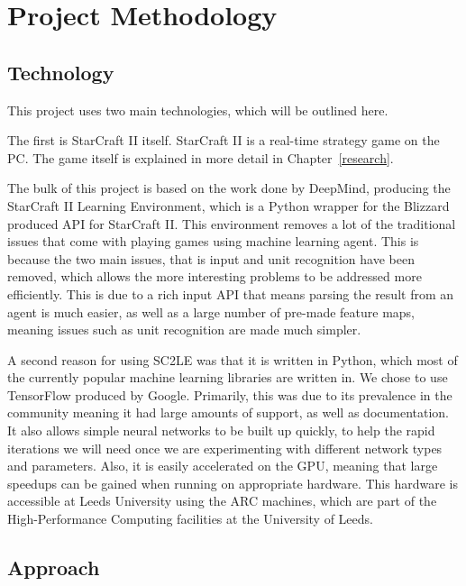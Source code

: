 \chapter{Project Methodology}%
\label{method}

\section{Technology}

This project uses two main technologies, which will be outlined here.

The first is StarCraft II itself. StarCraft II is a real-time strategy game on
the PC\@. The game itself is explained in more detail in
Chapter~\ref{research}.

The bulk of this project is based on the work done by DeepMind, producing
the StarCraft II Learning Environment, which is a Python\cite{python-website}
wrapper for the Blizzard produced API for StarCraft II\cite{bliz-api}. This
environment removes a lot of the traditional issues that come with playing
games using machine learning agent. This is because the two main issues, that
is input and unit recognition have been removed, which allows the more interesting
problems to be addressed more efficiently. This is due to a rich input API that means
parsing the result from an agent is much easier, as well as a large number
of pre-made feature maps, meaning issues such as unit recognition are made much
simpler.

A second reason for using SC2LE was that it is written in Python, which most
of the currently popular machine learning libraries are written in. We chose to
use TensorFlow\cite{abadi2016tensorflow} produced by Google. Primarily,
this was due to its prevalence in the community meaning it had large amounts of
support, as well as documentation. It also allows simple neural networks to be
built up quickly, to help the rapid iterations we will need once we are experimenting
with different network types and parameters. Also, it is easily accelerated on the
GPU, meaning that large speedups can be gained when running on appropriate hardware.
This hardware is accessible at Leeds University using the ARC machines, which are
part of the High-Performance Computing facilities at the University
of Leeds\cite{arc}.

\section{Approach}

